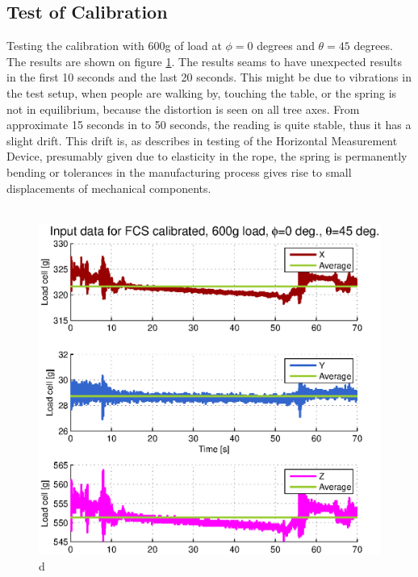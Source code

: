 \subsection{Test of Calibration}
Testing the calibration with 600g of load at $\phi=0$ degrees and $\theta=45$ degrees. The results are shown on figure \ref{fig:FCS-calib-results}. The results seams to have unexpected results in the first 10 seconds and the last 20 seconds. This might be due to vibrations in the test setup, when people are walking by, touching the table, or the spring is not in equilibrium, because the distortion is seen on all tree axes. From approximate 15 seconds in to 50 seconds, the reading is quite stable, thus it has a slight drift. This drift is, as describes in testing of the Horizontal Measurement Device, presumably given due to elasticity in the rope, the spring is permanently bending or tolerances in the manufacturing process gives rise to small displacements of mechanical components.\\
\\

\begin{figure}[hbtp]
\centering
\includegraphics[scale=1]{graphics/fcs_test/calib_result_compare.eps}
\caption{d}
\label{fig:FCS-calib-results}
\end{figure}



